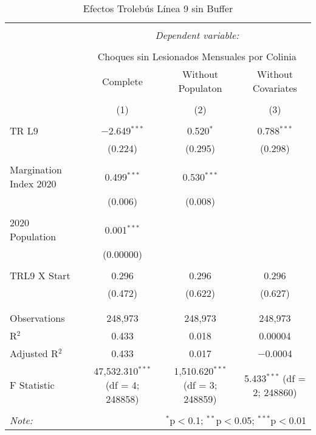 
\begin{table}[!htbp] \centering 
  \caption{Efectos Trolebús Línea 9 sin Buffer} 
  \label{} 
\begin{tabular}{@{\extracolsep{5pt}}lccc} 
\\[-1.8ex]\hline 
\hline \\[-1.8ex] 
 & \multicolumn{3}{c}{\textit{Dependent variable:}} \\ 
\cline{2-4} 
\\[-1.8ex] & \multicolumn{3}{c}{Choques sin Lesionados Mensuales por Colinia} \\ 
 & Complete & Without Populaton & Without Covariates \\ 
\\[-1.8ex] & (1) & (2) & (3)\\ 
\hline \\[-1.8ex] 
 TR L9 & $-$2.649$^{***}$ & 0.520$^{*}$ & 0.788$^{***}$ \\ 
  & (0.224) & (0.295) & (0.298) \\ 
  & & & \\ 
 Margination Index 2020 & 0.499$^{***}$ & 0.530$^{***}$ &  \\ 
  & (0.006) & (0.008) &  \\ 
  & & & \\ 
 2020 Population & 0.001$^{***}$ &  &  \\ 
  & (0.00000) &  &  \\ 
  & & & \\ 
 TRL9 X Start & 0.296 & 0.296 & 0.296 \\ 
  & (0.472) & (0.622) & (0.627) \\ 
  & & & \\ 
\hline \\[-1.8ex] 
Observations & 248,973 & 248,973 & 248,973 \\ 
R$^{2}$ & 0.433 & 0.018 & 0.00004 \\ 
Adjusted R$^{2}$ & 0.433 & 0.017 & $-$0.0004 \\ 
F Statistic & 47,532.310$^{***}$ (df = 4; 248858) & 1,510.620$^{***}$ (df = 3; 248859) & 5.433$^{***}$ (df = 2; 248860) \\ 
\hline 
\hline \\[-1.8ex] 
\textit{Note:}  & \multicolumn{3}{r}{$^{*}$p$<$0.1; $^{**}$p$<$0.05; $^{***}$p$<$0.01} \\ 
\end{tabular} 
\end{table} 
